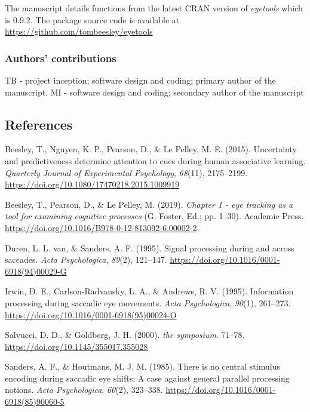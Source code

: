 \documentclass[
  man,
  floatsintext,
  longtable,
  nolmodern,
  notxfonts,
  notimes,
  colorlinks=true,linkcolor=blue,citecolor=blue,urlcolor=blue]{apa7}
\newlength{\cslhangindent}
\newenvironment{CSLReferences}[2] %
 {\begin{list}{}{%
  \setlength{\itemindent}{0pt}
  \setlength{\leftmargin}{0pt}
  \setlength{\parsep}{0pt}
  \ifodd #1
   \setlength{\leftmargin}{\cslhangindent}
   \setlength{\itemindent}{-1\cslhangindent}
  \fi
  \setlength{\itemsep}{#2\baselineskip}}}
 {\end{list}}
\begin{document}
The manuscript details functions from the latest CRAN version of
\emph{eyetools} which is 0.9.2. The package source code is available at
\url{https://github.com/tombeesley/eyetools}

\subsubsection{Authors' contributions}\label{authors-contributions}

TB - project inception; software design and coding; primary author of
the manuscript. MI - software design and coding; secondary author of the
manuscript

\subsection{References}\label{references}

\label{refs}
\begin{CSLReferences}{1}{0}
Beesley, T., Nguyen, K. P., Pearson, D., \& Le Pelley, M. E. (2015).
Uncertainty and predictiveness determine attention to cues during human
associative learning. \emph{Quarterly Journal of Experimental
Psychology}, \emph{68}(11), 2175--2199.
\url{https://doi.org/10.1080/17470218.2015.1009919}

Beesley, T., Pearson, D., \& Le Pelley, M. (2019). \emph{Chapter 1 - eye
tracking as a tool for examining cognitive processes} (G. Foster, Ed.;
pp. 1--30). Academic Press.
\url{https://doi.org/10.1016/B978-0-12-813092-6.00002-2}

Duren, L. L. van, \& Sanders, A. F. (1995). Signal processing during and
across saccades. \emph{Acta Psychologica}, \emph{89}(2), 121--147.
\url{https://doi.org/10.1016/0001-6918(94)00029-G}

Irwin, D. E., Carlson-Radvansky, L. A., \& Andrews, R. V. (1995).
Information processing during saccadic eye movements. \emph{Acta
Psychologica}, \emph{90}(1), 261--273.
\url{https://doi.org/10.1016/0001-6918(95)00024-O}

Salvucci, D. D., \& Goldberg, J. H. (2000). \emph{the symposium}.
71--78. \url{https://doi.org/10.1145/355017.355028}

Sanders, A. F., \& Houtmans, M. J. M. (1985). There is no central
stimulus encoding during saccadic eye shifts: A case against general
parallel processing notions. \emph{Acta Psychologica}, \emph{60}(2),
323--338. \url{https://doi.org/10.1016/0001-6918(85)90060-5}

\end{CSLReferences}
\end{document}
